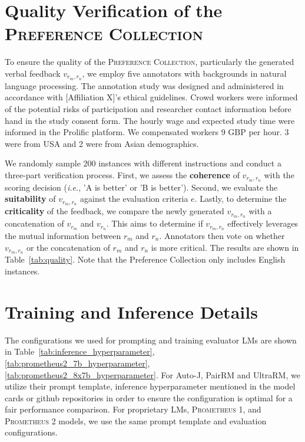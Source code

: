 \documentclass[11pt]{article}
\begin{document}
\section{Quality Verification of the \textsc{Preference Collection}}\label{appendix:quality_verification}

To ensure the quality of the \textsc{Preference Collection}, particularly the generated verbal feedback ${v}_{{r}_{m},{r}_{n}}$, we employ five annotators with backgrounds in natural language processing. The annotation study was designed and administered in accordance with [Affiliation X]'s ethical guidelines. Crowd workers were informed of the potential risks of participation and researcher contact information before hand in the study consent form. The hourly wage and expected study time were informed in the Prolific platform. We compensated workers 9 GBP per hour. 3 were from USA and 2 were from Asian demographics. 

We randomly sample 200 instances with different instructions and conduct a three-part verification process. First, we assess the \textbf{coherence} of ${v}_{{r}_{m},{r}_{n}}$ with the scoring decision (\textit{i.e.}, 'A is better' or 'B is better'). Second, we evaluate the \textbf{suitability} of ${v}_{{r}_{m},{r}_{n}}$ against the evaluation criteria $e$. Lastly, to determine the \textbf{criticality} of the feedback, we compare the newly generated ${v}_{{r}_{m},{r}_{n}}$ with a concatenation of ${v}_{{r}_{m}}$ and ${v}_{{r}_{n}}$. This aims to determine if ${v}_{{r}_{m},{r}_{n}}$ effectively leverages the mutual information between ${r}_{m}$ and ${r}_{n}$. Annotators then vote on whether ${v}_{{r}_{m},{r}_{n}}$ or the concatenation of ${r}_{m}$ and ${r}_{n}$ is more critical. The results are shown in Table~\ref{tab:quality}. Note that the Preference Collection only includes English instances.

\section{Training and Inference Details}\label{appendix:hyperparameter}

The configurations we used for prompting and training evaluator LMs are shown in Table~\ref{tab:inference_hyperparameter}, \ref{tab:prometheus2_7b_hyperparameter}, \ref{tab:prometheus2_8x7b_hyperparameter}. For Auto-J, PairRM and UltraRM, we utilize their prompt template, inference hyperparameter mentioned in the model cards or github repositories in order to ensure the configuration is optimal for a fair performance comparison. For proprietary LMs, \textsc{Prometheus 1}, and \textsc{Prometheus 2} models, we use the same prompt template and evaluation configurations.
\end{document}
